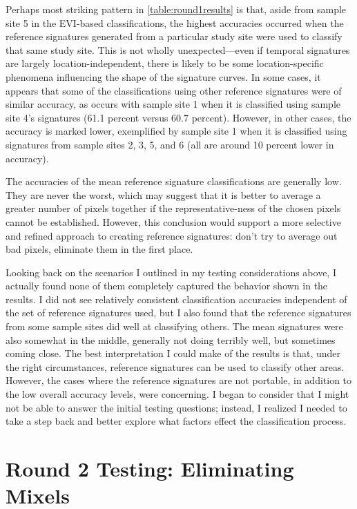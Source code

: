 Perhaps most striking pattern in \autoref{table:round1results} is that, aside from sample site 5 in the EVI-based classifications, the highest accuracies occurred when the reference signatures generated from a particular study site were used to classify that same study site. This is not wholly unexpected—even if temporal signatures are largely location-independent, there is likely to be some location-specific phenomena influencing the shape of the signature curves. In some cases, it appears that some of the classifications using other reference signatures were of similar accuracy, as occurs with sample site 1 when it is classified using sample site 4’s signatures (61.1 percent versus 60.7 percent). However, in other cases, the accuracy is marked lower, exemplified by sample site 1 when it is classified using signatures from sample sites 2, 3, 5, and 6 (all are around 10 percent lower in accuracy).

The accuracies of the mean reference signature classifications are generally low. They are never the worst, which may suggest that it is better to average a greater number of pixels together if the representative-ness of the chosen pixels cannot be established. However, this conclusion would support a more selective and refined approach to creating reference signatures: don’t try to average out bad pixels, eliminate them in the first place.

Looking back on the scenarios I outlined in my testing considerations above, I actually found none of them completely captured the behavior shown in the results. I did not see relatively consistent classification accuracies independent of the set of reference signatures used, but I also found that the reference signatures from some sample sites did well at classifying others. The mean signatures were also somewhat in the middle, generally not doing terribly well, but sometimes coming close. The best interpretation I could make of the results is that, under the right circumstances, reference signatures can be used to classify other areas. However, the cases where the reference signatures are not portable, in addition to the low overall accuracy levels, were concerning. I began to consider that I might not be able to answer the initial testing questions; instead, I realized I needed to take a step back and better explore what factors effect the classification process.

\section{Round 2 Testing: Eliminating Mixels}
\label{appendix:testing:r2}

